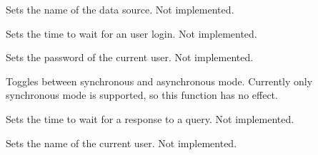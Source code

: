 

Sets the name of the data source. Not implemented.



Sets the time to wait for an user login. Not implemented.



Sets the password of the current user. Not implemented.



Toggles between synchronous and asynchronous mode. Currently only synchronous
mode is supported, so this function has no effect.



Sets the time to wait for a response to a query. Not implemented.



Sets the name of the current user. Not implemented.


